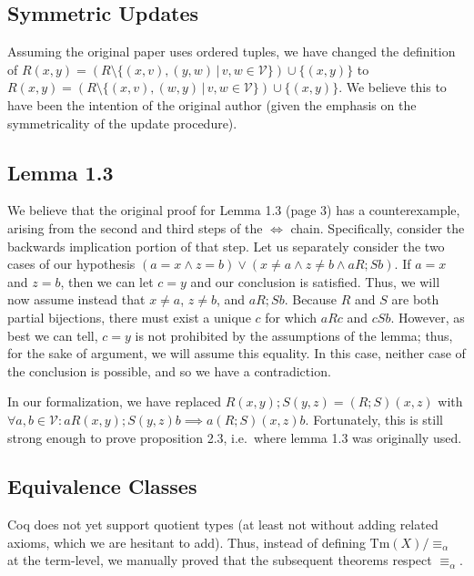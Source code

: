 \documentclass{article}
\begin{document}
\subsection{Symmetric Updates}

Assuming the original paper uses ordered tuples, we have changed the definition of $R(x,y) = (R
\setminus \{ (x,v),(y,w) \, | \, v,w \in \mathcal{V} \}) \cup \{ (x,y) \}$ to $R(x,y) = (R \setminus \{
(x,v),(w,y) \, | \, v,w \in \mathcal{V} \}) \cup \{ (x,y) \}$. We believe this to have been the intention
of the original author (given the emphasis on the symmetricality of the update procedure).

\subsection{Lemma 1.3}

We believe that the original proof for Lemma 1.3 (page 3) has a counterexample, arising from the second
and third steps of the $\iff$ chain. Specifically, consider the backwards implication portion of
that step. Let us separately consider the two cases of our hypothesis $(a = x \land z = b) \lor (x
\neq a \land z \neq b \land a R; S b)$. If $a = x$ and $z = b$, then we can let $c = y$ and our
conclusion is satisfied. Thus, we will now assume instead that $x \neq a$, $z \neq b$, and $a R; S b$.
Because $R$ and $S$ are both partial bijections, there must exist a unique $c$ for which $aRc$ and
$cSb$. However, as best we can tell, $c = y$ is not prohibited by the assumptions of the lemma;
thus, for the sake of argument, we will assume this equality. In this case, neither case of the
conclusion is possible, and so we have a contradiction.

In our formalization, we have replaced $R(x,y); S(y,z) = (R;S)(x,z)$ with $\forall a, b \in
\mathcal{V} : a R(x,y); S(y,z) b \implies a (R;S)(x,z) b$. Fortunately, this is still strong enough to
prove proposition 2.3, i.e.\ where lemma 1.3 was originally used.

\subsection{Equivalence Classes}

Coq does not yet support quotient types (at least not without adding related axioms, which we are
hesitant to add). Thus, instead of defining $\textrm{Tm}(X)/\equiv_\alpha$ at the term-level, we
manually proved that the subsequent theorems respect $\equiv_\alpha$.
\end{document}
